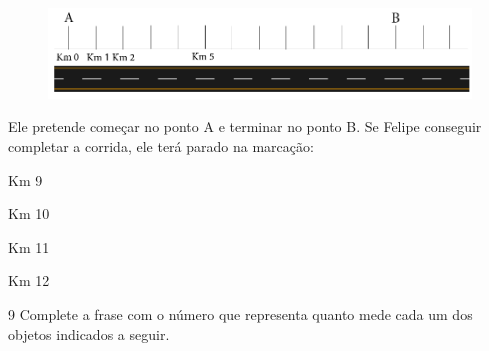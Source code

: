 \begin{figure}[htpb!]
\includegraphics[width=\textwidth]{../ilustracoes/MAT5/SAEB_5ANO_MAT_figura6.png}
\end{figure}

Ele pretende começar no ponto A e terminar no ponto B. Se Felipe
conseguir completar a corrida, ele terá parado na marcação:

\begin{minipage}{.5\textwidth}
\begin{escolha}
\item
  Km 9
\item
  Km 10
\item
  Km 11
\item
  Km 12
\end{escolha}
\end{minipage}

\num{9} Complete a frase com o número que representa quanto mede cada um
dos objetos indicados a seguir.


